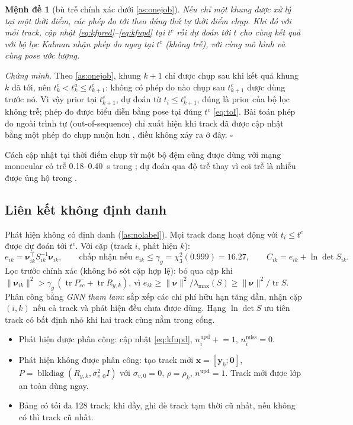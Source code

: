\documentclass[11pt,a4paper]{article}
\numberwithin{equation}{section}
\newcommand{\vb}[1]{\bm{#1}}
\newcommand{\T}{^{\!\top}}
\newcommand{\lmax}{\lambda_{\max}}
\theoremstyle{definition}
\theoremstyle{plain}
\newtheorem{proposition}{Mệnh đề}
\theoremstyle{remark}
\begin{document}
\begin{proposition}[bù trễ chính xác dưới \ref{as:onejob}]\label{prop:exact}
Nếu chỉ một khung được xử lý tại một thời điểm, các phép đo tới theo đúng thứ tự thời điểm chụp. Khi đó với mỗi track, cập nhật \eqref{eq:kfpred}--\eqref{eq:kfupd} tại $t^c$ rồi dự đoán tới $t$ cho cùng kết quả với bộ lọc Kalman nhận phép đo ngay tại $t^c$ (không trễ), với cùng mô hình và cùng pose ước lượng.
\end{proposition}
\emph{Chứng minh.} Theo \ref{as:onejob}, khung $k+1$ chỉ được chụp sau khi kết quả khung $k$ đã tới, nên $t^c_k<t^a_k\le t^c_{k+1}$: không có phép đo nào chụp sau $t^c_{k+1}$ được dùng trước nó. Vì vậy prior tại $t^c_{k+1}$, dự đoán từ $t_i\le t^c_{k+1}$, đúng là prior của bộ lọc không trễ; phép đo được biểu diễn bằng pose tại đúng $t^c$ \eqref{eq:toI}. Bài toán phép đo ngoài trình tự (out-of-sequence) chỉ xuất hiện khi track đã được cập nhật bằng một phép đo chụp muộn hơn \cite{barshalom2002oosm,garcia2021oos}, điều không xảy ra ở đây. $\square$

Cách cập nhật tại thời điểm chụp từ một bộ đệm cũng được dùng với mạng monocular có trễ 0.18--0.40~s trong \cite{wickramasuriya2026}; dự đoán qua độ trễ thay vì coi trễ là nhiễu được ủng hộ trong \cite{molnar2022iss}.

\subsection{Liên kết không định danh}
\label{sec:assoc}
Phát hiện không có định danh (\ref{as:nolabel}). Mọi track đang hoạt động với $t_i\le t^c$ được dự đoán tới $t^c$. Với cặp (track $i$, phát hiện $k$):
\begin{equation}
e_{ik}=\bm\nu_{ik}\T S_{ik}^{-1}\bm\nu_{ik},\qquad \text{chấp nhận nếu } e_{ik}\le\gamma_g=\chi^2_3(0.999)=16.27,\qquad
C_{ik}=e_{ik}+\ln\det S_{ik}. \label{eq:gate}
\end{equation}
Lọc trước chính xác (không bỏ sót cặp hợp lệ): bỏ qua cặp khi $\|\bm\nu_{ik}\|^2>\gamma_g\,(\operatorname{tr}P^-_{cc}+\operatorname{tr}R_{y,k})$, vì $e_{ik}\ge\|\bm\nu\|^2/\lmax(S)\ge\|\bm\nu\|^2/\operatorname{tr}S$. Phân công bằng \emph{GNN tham lam}: sắp xếp các chi phí hữu hạn tăng dần, nhận cặp $(i,k)$ nếu cả track và phát hiện đều chưa được dùng. Hạng $\ln\det S$ ưu tiên track có bất định nhỏ khi hai track cùng nằm trong cổng.
\begin{itemize}
\item Phát hiện được phân công: cập nhật \eqref{eq:kfupd}, $n_i^{\text{upd}}\mathrel{+}=1$, $n_i^{\text{miss}}=0$.
\item Phát hiện không được phân công: tạo track mới $\vb x=[\vb y_k;\vb 0]$, $P=\operatorname{blkdiag}(R_{y,k},\sigma_{v,0}^2I)$ với $\sigma_{v,0}=0$, $\rho=\rho_k$, $n^{\text{upd}}=1$. Track mới được lớp an toàn dùng ngay.
\item Bảng có tối đa 128 track; khi đầy, ghi đè track tạm thời cũ nhất, nếu không có thì track cũ nhất.
\end{itemize}
\end{document}
